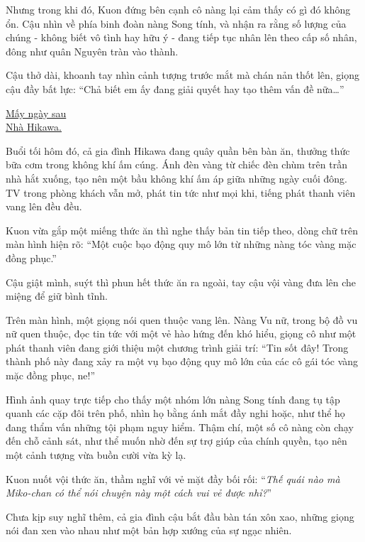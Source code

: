 \documentclass[../main.tex]{subfiles}
\begin{document}
Nhưng trong khi đó, Kuon đứng bên cạnh cô nàng lại cảm thấy có gì đó không ổn. Cậu nhìn về phía binh đoàn nàng Song tính, và nhận ra rằng số lượng của chúng - không biết vô tình hay hữu ý - đang tiếp tục nhân lên theo cấp số nhân, đông như quân Nguyên tràn vào thành.

Cậu thở dài, khoanh tay nhìn cảnh tượng trước mắt mà chán nản thốt lên, giọng cậu đầy bất lực: ``Chả biết em ấy đang giải quyết hay tạo thêm vấn đề nữa\dots''

\begin{center}
  \uline{Mấy ngày sau\\Nhà Hikawa.}
\end{center}

Buổi tối hôm đó, cả gia đình Hikawa đang quây quần bên bàn ăn, thưởng thức bữa cơm trong không khí ấm cúng. Ánh đèn vàng từ chiếc đèn chùm trên trần nhà hắt xuống, tạo nên một bầu không khí ấm áp giữa những ngày cuối đông. TV trong phòng khách vẫn mở, phát tin tức như mọi khi, tiếng phát thanh viên vang lên đều đều.

Kuon vừa gắp một miếng thức ăn thì nghe thấy bản tin tiếp theo, dòng chữ trên màn hình hiện rõ: ``Một cuộc bạo động quy mô lớn từ những nàng tóc vàng mặc đồng phục.''

Cậu giật mình, suýt thì phun hết thức ăn ra ngoài, tay cậu vội vàng đưa lên che miệng để giữ bình tĩnh.

Trên màn hình, một giọng nói quen thuộc vang lên. Nàng Vu nữ, trong bộ đồ vu nữ quen thuộc, đọc tin tức với một vẻ hào hứng đến khó hiểu, giọng cô như một phát thanh viên đang giới thiệu một chương trình giải trí: ``Tin sốt đây! Trong thành phố này đang xảy ra một vụ bạo động quy mô lớn của các cô gái tóc vàng mặc đồng phục, ne!''


Hình ảnh quay trực tiếp cho thấy một nhóm lớn nàng Song tính đang tụ tập quanh các cặp đôi trên phố, nhìn họ bằng ánh mắt đầy nghi hoặc, như thể họ đang thẩm vấn những tội phạm nguy hiểm. Thậm chí, một số cô nàng còn chạy đến chỗ cảnh sát, như thể muốn nhờ đến sự trợ giúp của chính quyền, tạo nên một cảnh tượng vừa buồn cười vừa kỳ lạ.

Kuon nuốt vội thức ăn, thầm nghĩ với vẻ mặt đầy bối rối: ``\textit{Thế quái nào mà Miko-chan có thể nói chuyện này một cách vui vẻ được nhỉ?}''

Chưa kịp suy nghĩ thêm, cả gia đình cậu bắt đầu bàn tán xôn xao, những giọng nói đan xen vào nhau như một bản hợp xướng của sự ngạc nhiên.
\end{document}
